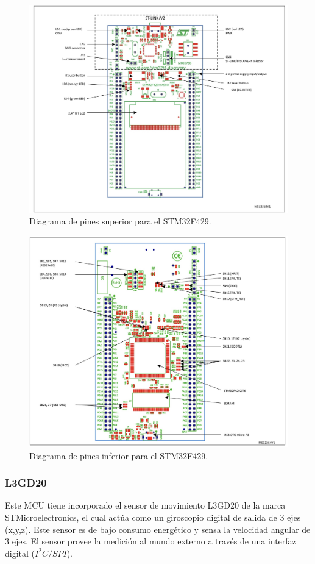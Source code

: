     \begin{figure}[H]
        \centering
        \includegraphics[width=0.8\linewidth]{fotos/pin top.jpeg}
        \caption{Diagrama de pines superior para el STM32F429. \cite{STM2}}
        \label{diag_pines_top}
    \end{figure}

    \begin{figure}[H]
        \centering
        \includegraphics[width=0.8\linewidth]{fotos/pin bottom.jpeg}
        \caption{Diagrama de pines inferior para el STM32F429. \cite{STM2}}
        \label{diag_pines_bottom}
    \end{figure}

\subsubsection{L3GD20}
 Este MCU tiene incorporado el sensor de movimiento L3GD20 de la marca STMicroelectronics, el cual actúa como un giroscopio digital de salida de 3 ejes (x,y,z). \cite{STM} Este sensor es de bajo consumo energético y sensa la velocidad angular de 3 ejes. El sensor provee la medición al mundo externo a través de una interfaz digital ($I^{2}C/SPI$). 

